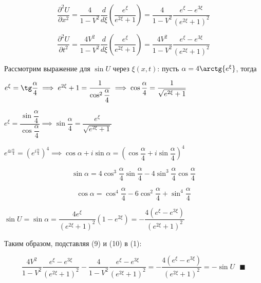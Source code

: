 \documentclass[a4paper, 12pt]{article}
\begin{document}
	\begin{equation}
		\dfrac{\partial^2 U}{\partial x^2} = \dfrac{4}{1 - V^2} \dfrac{d}{d\xi} \left(\dfrac{e^{\xi}}{e^{2\xi} + 1}\right) = \dfrac{4}{1-V^2}\dfrac{e^{\xi} - e^{3\xi}}{\left(e^{2\xi} + 1\right)^2} 
	\end{equation}
	
	\begin{equation}
		\dfrac{\partial^2 U}{\partial t^2} = \dfrac{4V^2}{1-V^2} \dfrac{d}{d\xi}\left(\dfrac{e^\xi}{e^{2\xi} + 1}\right) = \dfrac{4V^2}{1-V^2} \dfrac{e^\xi - e^{3\xi}}{\left(e^{2\xi}+ 1\right)^2} 
	\end{equation}
	
	\quad Рассмотрим выражение для $\sin U $ через $\xi(x, t)$: пусть $\alpha = 4\arctg{e^{\xi}}$, тогда 
	
	\begin{center}
		$e^{\xi} = \tg\dfrac{\alpha}{4} \implies e^{2\xi } + 1 = \dfrac{1}{\cos^2 \dfrac{\alpha}{4}} \implies \cos\dfrac{\alpha}{4} = \dfrac{1}{\sqrt{e^{2\xi} + 1}}$
		
		$e^{\xi} = \dfrac{\sin\dfrac{\alpha}{4}}{\cos\dfrac{\alpha}{4}} \implies \sin\dfrac{\alpha}{4} = \dfrac{e^{\xi}}{\sqrt{e^{2\xi} + 1}}$
		
		$e^{4i\frac{\alpha}{4}} = \left(e^{i\frac{\alpha}{4}}\right)^4 \implies \cos\alpha + i\sin\alpha = \left(\cos\dfrac{\alpha}{4} + i\sin\dfrac{\alpha}{4}\right)^4$
	\end{center}
	
	\begin{equation}
		\sin\alpha = 4\cos^3 \dfrac{\alpha}{4} \sin\dfrac{\alpha}{4} - 4\sin^3\dfrac{\alpha}{4}\cos\dfrac{\alpha}{4} 
	\end{equation}
	
	\begin{equation}
		\cos\alpha = \cos^4 \dfrac{\alpha}{4} - 6\cos^2\dfrac{\alpha}{4} + \sin^4 \dfrac{\alpha}{4}
	\end{equation}
	
	\begin{center}
		$\sin U = \sin \alpha = \dfrac{4e^{\xi}}{\left(e^{2\xi}+1\right)^2}(1 - e^{2\xi}) = -\dfrac{4(e^{\xi} - e^{3\xi})}{\left(e^{2\xi} + 1\right)^2}$
	\end{center}
	
	\quad Таким образом, подставляя (9) и (10) в (1): 
	
	\begin{equation}
		\dfrac{4V^2}{1-V^2} \dfrac{e^\xi - e^{3\xi}}{\left(e^{2\xi}+ 1\right)^2} - \dfrac{4}{1-V^2}\dfrac{e^{\xi} - e^{3\xi}}{\left(e^{2\xi} + 1\right)^2} = -\dfrac{4\left(e^{\xi} - e^{3\xi}\right)}{\left(e^{2\xi} + 1\right)^2} = -\sin U \text { } \blacksquare
	\end{equation}
	
\end{document}
